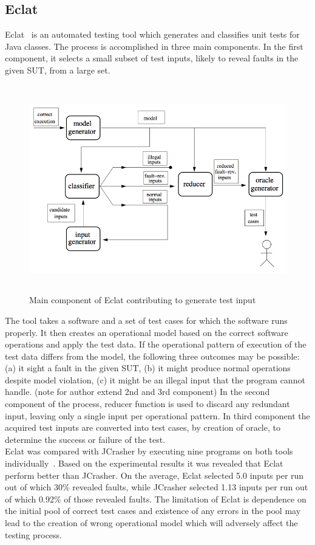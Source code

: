 \subsection{Eclat}
Eclat~\cite{Pacheco2005} is an automated testing tool which generates and classifies unit tests for Java classes. The process is accomplished in three main components. In the first component, it selects a small subset of test inputs, likely to reveal faults in the given SUT, from a large set.

\begin{figure}[h]
	\centering
	\includegraphics[width=15cm, height=9cm]{chapter3/eclat_working.png}
	\caption{Main component of Eclat contributing to generate test input~\cite{Pacheco2005}}
	\label{fig:eclat}
\end{figure}


\noindent The tool takes a software and a set of test cases for which the software runs properly. It then creates an operational model based on the correct software operations and apply the test data. If the operational pattern of execution of the test data differs from the model, the following three outcomes may be possible: (a) it sight a fault in the given SUT, (b) it might produce normal operations despite model violation, (c) it might be an illegal input that the program cannot handle. (note for author extend 2nd and 3rd component)
In the second component of the process, reducer function is used to discard any redundant input, leaving only a single input per operational pattern. In third component the acquired test inputs are converted into test cases, by creation of oracle, to determine the success or failure of the test. \\
\indent Eclat was compared with JCrasher by executing nine programs on  both tools individually~\cite{Pacheco2007b}. Based on the experimental results it was revealed that Eclat perform better than JCrasher. On the average, Eclat selected 5.0 inputs per run out of which 30\% revealed faults, while JCrasher selected 1.13 inputs per run out of which 0.92\% of those revealed faults. The limitation of Eclat is dependence on the initial pool of correct test cases and existence of any errors in the pool may lead to the creation of wrong operational model which will adversely affect the testing process.   

